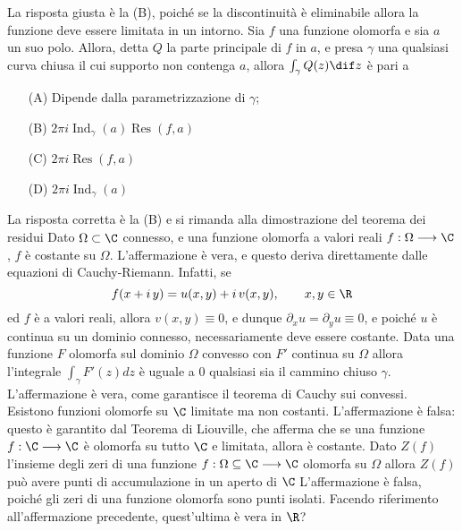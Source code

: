     La risposta giusta è la (B), poiché se la discontinuità è eliminabile allora la funzione deve essere limitata in un intorno. 
    Sia $f$ una funzione olomorfa e sia $a$ un suo polo. Allora, detta $Q$ la parte principale di $f$ in $a$, e presa $\gamma$ una qualsiasi curva chiusa il cui supporto non contenga $a$, allora $\int_{\gamma} Q(z) \dif z$ è pari a \begin{itemize}
        \item[(A)] Dipende dalla parametrizzazione di $\gamma$;
        \item[(B)] $2\pi i \operatorname{Ind}_{\gamma}(a) \operatorname{Res}(f,a)$
        \item[(C)] $2\pi i \operatorname{Res}(f,a)$
        \item[(D)] $2\pi i \operatorname{Ind}_{\gamma}(a)$
    \end{itemize}
    La risposta corretta è la (B) e si rimanda alla dimostrazione del teorema dei residui
    Dato $\Omega\subset\C$ connesso, e una funzione olomorfa a valori reali $f:\Omega\longrightarrow\C$, $ f $ è costante su $\Omega$. 
    L'affermazione è vera, e questo deriva direttamente dalle equazioni di Cauchy-Riemann. Infatti, se \[
        f(x+i\,y) = u(x,y) + i\,v(x,y),\qquad x,y \in \R
    \]ed $ f $ è a valori reali, allora $ v(x,y)\equiv 0 $, e dunque $ \partial_{x} u = \partial_{y} u \equiv 0 $, e poiché $ u $ è continua su un dominio connesso, necessariamente deve essere costante.
    Data una funzione $F$ olomorfa sul dominio $\Omega$ convesso con $F'$ continua su $\Omega$ allora l'integrale $\int_{\gamma}F'(z)dz$ è uguale a 0 qualsiasi sia il cammino chiuso $\gamma$.
    L'affermazione è vera, come garantisce il teorema di Cauchy sui convessi. 
    Esistono funzioni olomorfe su $ \C $ limitate ma non costanti.
    L'affermazione è falsa: questo è garantito dal Teorema di Liouville, che afferma che se una funzione $ f: \C \longrightarrow \C $ è olomorfa su tutto $ \C $ e limitata, allora è costante.
    Dato $Z(f)$ l'insieme degli zeri di una funzione $f:\Omega \subseteq \C\longrightarrow\C$ olomorfa su $\Omega$ allora $Z(f)$ può avere punti di accumulazione in un aperto di $\C$
    L'affermazione è falsa, poiché gli zeri di una funzione olomorfa sono punti isolati. 
    Facendo riferimento all'affermazione precedente, quest'ultima è vera in $ \R $? 

